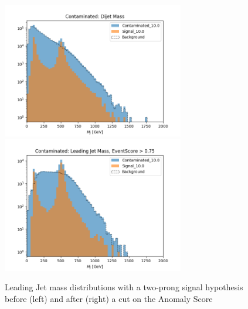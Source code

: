 \documentclass[12pt, a4paper]{article}
\begin{document}
\begin{figure}[H]
	\begin{center}
		\includegraphics[width=225pt]{imgs/2Prong_Contaminated_10p0_J_Mass_Multi.png}
		\includegraphics[width=225pt]{imgs/2Prong_Contaminated_10p0_J_Mass_EventScore0p75_Multi.png}
	\end{center}
	\caption{Leading Jet mass distributions with a two-prong signal hypothesis before (left) and after (right) a cut on the Anomaly Score}
	\label{fig:2P_lj_mass}
\end{figure}
\end{document}
